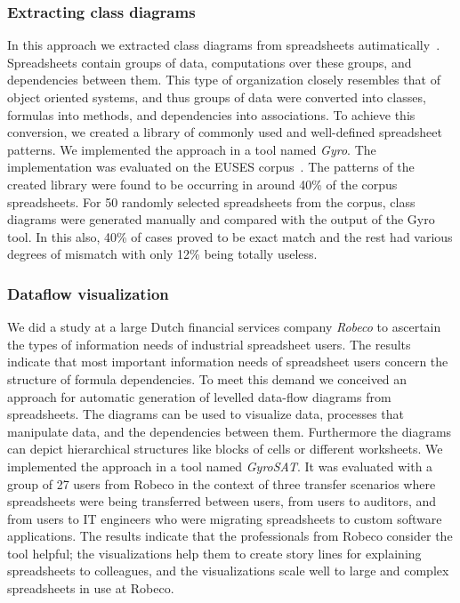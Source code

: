 \documentclass[conference]{IEEEtran}
\begin{document}
\subsubsection{Extracting class diagrams}
In this approach we extracted class diagrams from spreadsheets autimatically~\cite{hermans_automatically_2010}. Spreadsheets contain groups of data, computations over these groups, and dependencies between them. This type of organization closely resembles that of object oriented systems, and thus groups of data were converted into classes, formulas into methods, and dependencies into associations. To achieve this conversion, we created a library of commonly used and well-defined spreadsheet patterns. We implemented the approach in a tool named \textit{Gyro}. The implementation was evaluated on the EUSES corpus~\cite{fisher_euses_2005}. The patterns of the created library were found to be occurring in around 40\% of the corpus spreadsheets. For 50 randomly selected spreadsheets from the corpus, class diagrams were generated manually and compared with the output of the Gyro tool. In this also, 40\% of cases proved to be exact match and the rest had various degrees of mismatch with only 12\% being totally useless.

\subsubsection{Dataflow visualization}
We did a study at a large Dutch financial services company \textit{Robeco} to ascertain the types of information needs of industrial spreadsheet users\cite{hermans_supporting_2011}. The results indicate that most important information needs of spreadsheet users concern the structure of formula dependencies. To meet this demand we conceived an approach for automatic generation of levelled data-flow diagrams from spreadsheets. The diagrams can be used to visualize data, processes that manipulate data, and the dependencies between them. Furthermore the diagrams can depict hierarchical structures like blocks of cells or different worksheets. We implemented the approach in a tool named \textit{GyroSAT}. It was evaluated with a group of 27 users from Robeco in the context of three transfer scenarios where spreadsheets were being transferred between users, from users to auditors, and from users to IT engineers who were migrating spreadsheets to custom software applications. The results indicate that the professionals from Robeco consider the tool helpful; the visualizations help them to create story lines for explaining spreadsheets to colleagues, and the visualizations scale well to large and complex spreadsheets in use at Robeco.
\end{document}
